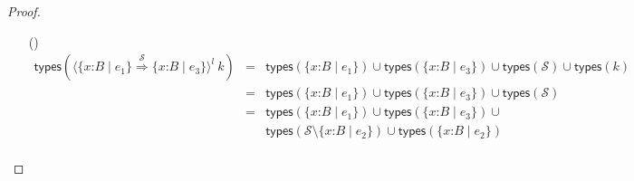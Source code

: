 \documentclass[9pt]{extarticle}
\newcommand{\ottnt}[1]{\mathit{#1}}
\begin{document}
\begin{lemma}
\begin{proof}
{\begin{itemize}
\[\begin{array}{rclr}
        &=&    \mathsf{types} (  \{ \mathit{x} \mathord{:} \ottnt{B} \mathrel{\mid} \ottnt{e_{{\mathrm{2}}}} \}  )   \cup   \mathsf{types} ( \ottnt{e_{{\mathrm{2}}}} )    \cup   \mathsf{types} ( \ottnt{k} )   & \\
        &\supseteq&   \mathsf{types} (  \{ \mathit{x} \mathord{:} \ottnt{B} \mathrel{\mid} \ottnt{e_{{\mathrm{2}}}} \}  )   \cup   \mathsf{types} (  \ottnt{e_{{\mathrm{2}}}}  [  \ottnt{k} / \mathit{x}  ]  )   & \text{(Lemma~\ref{lem:typessubstitution})} \\
        &=&  \mathsf{types} (  \{ \mathit{x} \mathord{:} \ottnt{B} \mathrel{\mid} \ottnt{e_{{\mathrm{2}}}} \}  )  & \text{since $ \mathsf{types} ( \ottnt{k} )  =  \emptyset $}\\
        &=&  \mathsf{types} (  \langle   \{ \mathit{x} \mathord{:} \ottnt{B} \mathrel{\mid} \ottnt{e_{{\mathrm{2}}}} \}  ,   \ottnt{e_{{\mathrm{2}}}}  [  \ottnt{k} / \mathit{x}  ]  ,  \ottnt{k}  \rangle^{ \ottnt{l} }  ) 
      \end{array} \]
    \item[(\E{CheckSet})]  \[ \begin{array}{rcl}
         \mathsf{types} (  \langle   \{ \mathit{x} \mathord{:} \ottnt{B} \mathrel{\mid} \ottnt{e_{{\mathrm{1}}}} \}   \mathord{ \overset{ \mathcal{S} }{\Rightarrow} }   \{ \mathit{x} \mathord{:} \ottnt{B} \mathrel{\mid} \ottnt{e_{{\mathrm{3}}}} \}   \rangle^{ \ottnt{l} } ~  \ottnt{k}  )  &=& 
            \mathsf{types} (  \{ \mathit{x} \mathord{:} \ottnt{B} \mathrel{\mid} \ottnt{e_{{\mathrm{1}}}} \}  )   \cup   \mathsf{types} (  \{ \mathit{x} \mathord{:} \ottnt{B} \mathrel{\mid} \ottnt{e_{{\mathrm{3}}}} \}  )    \cup   \mathsf{types} ( \mathcal{S} )    \cup   \mathsf{types} ( \ottnt{k} )    \\
        &=&    \mathsf{types} (  \{ \mathit{x} \mathord{:} \ottnt{B} \mathrel{\mid} \ottnt{e_{{\mathrm{1}}}} \}  )   \cup   \mathsf{types} (  \{ \mathit{x} \mathord{:} \ottnt{B} \mathrel{\mid} \ottnt{e_{{\mathrm{3}}}} \}  )    \cup   \mathsf{types} ( \mathcal{S} )    \\
        &=&     \mathsf{types} (  \{ \mathit{x} \mathord{:} \ottnt{B} \mathrel{\mid} \ottnt{e_{{\mathrm{1}}}} \}  )   \cup   \mathsf{types} (  \{ \mathit{x} \mathord{:} \ottnt{B} \mathrel{\mid} \ottnt{e_{{\mathrm{3}}}} \}  )    \cup  {} \\  &  &   \mathsf{types} (  \mathcal{S}  \setminus   \{ \mathit{x} \mathord{:} \ottnt{B} \mathrel{\mid} \ottnt{e_{{\mathrm{2}}}} \}   )    \cup   \mathsf{types} (  \{ \mathit{x} \mathord{:} \ottnt{B} \mathrel{\mid} \ottnt{e_{{\mathrm{2}}}} \}  )   \\

\end{array}\]
\end{itemize}}
\end{proof}
\end{lemma}
\end{document}

